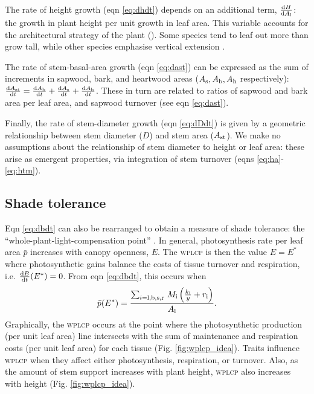 \documentclass[9pt,twocolumn,twoside,lineno]{pnas-new}
\newcommand{\wplcp}{\textsc{wplcp}}
\begin{document}
The rate of height growth (eqn \ref{eq:dhdt}) depends on an additional term, $\frac{{\rm d}H }{{\rm d}A_{\rm l}}$: the growth in plant height per unit growth in leaf area. This variable accounts for the architectural strategy of the plant (\citep{Falster-2011}). Some species tend to leaf out more than grow tall, while other species emphasise vertical extension \citep{Poorter-2006}.

The rate of stem-basal-area growth (eqn \ref{eq:dast}) can be expressed as the sum of increments in sapwood, bark, and heartwood areas ($A_{\rm s}, A_{\rm b}, A_{\rm h}$ respectively): $\frac{{\rm d}A_{\rm st}}{{\rm d}t}= \frac{{\rm d}A_{\rm b}}{{\rm d}t} + \frac{{\rm d}A_{\rm s}}{{\rm d}t} + \frac{{\rm d}A_{\rm h}}{{\rm d}t}$. These in turn are related to ratios of sapwood and bark area per leaf area, and sapwood turnover (see eqn \ref{eq:dast}).

Finally, the rate of stem-diameter growth (eqn \ref{eq:dDdt}) is given by a geometric relationship between stem diameter ($D$) and stem area ($A_{\rm st}$). We make no assumptions about the relationship of stem diameter to height or leaf area: these arise as emergent properties, via integration of stem turnover (eqns \ref{eq:ha}-\ref{eq:htm}).



\subsection{Shade tolerance}

Eqn \ref{eq:dbdt} can also be rearranged to obtain a measure of shade tolerance: the ``whole-plant-light-compensation point'' \citep[{\wplcp}][]{Givnish-1988, Baltzer-2007, Lusk-2013} . In general, photosynthesis rate per leaf area $\bar{p}$ increases with canopy openness, $E$. The {\wplcp} is then the value $E=E^*$ where photosynthetic gains balance the costs of tissue turnover and respiration, i.e. $\frac{{\rm d}B}{{\rm d}t}(E^*)=0$. From eqn \ref{eq:dbdt}, this occurs when
\begin{equation}\label{eq:wplcp}
\bar{p}(E^*) =\frac{\sum_{i={\rm l,b,s,r}} \, M_{\rm i} \left(\frac{k_{\rm i}}{y} + r_{\rm i}\right)}{A_{\rm l}}.
\end{equation}
Graphically, the {\wplcp} occurs at the point where the photosynthetic production (per unit leaf area) line intersects with the sum of maintenance and respiration costs (per unit leaf area) for each tissue (Fig. \ref{fig:wplcp_idea}). Traits influence {\wplcp} when they affect either photosynthesis, respiration, or turnover. Also, as the amount of stem support increases with plant height, {\wplcp} also increases with height \citep{Givnish-1988} (Fig. \ref{fig:wplcp_idea}).
\end{document}
